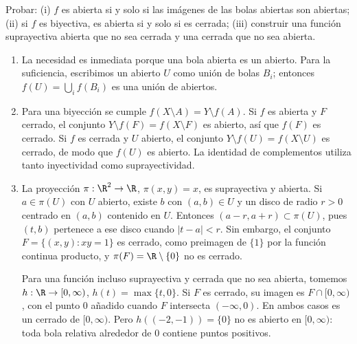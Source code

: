 \begin{ejercicio}\label{ej:lectura-5-7}
Probar: (i) $f$ es abierta si y solo si las imágenes de las bolas abiertas son abiertas; (ii) si $f$ es biyectiva, es abierta si y solo si es cerrada; (iii) construir una función suprayectiva abierta que no sea cerrada y una cerrada que no sea abierta.
\end{ejercicio}
\begin{solucion}
\begin{enumerate}[label=(\roman*)]
\item La necesidad es inmediata porque una bola abierta es un abierto. Para la suficiencia, escribimos un abierto $U$ como unión de bolas $B_i$; entonces $f(U)=\bigcup_if(B_i)$ es una unión de abiertos.
\item Para una biyección se cumple $f(X\setminus A)=Y\setminus f(A)$. Si $f$ es abierta y $F$ cerrado, el conjunto $Y\setminus f(F)=f(X\setminus F)$ es abierto, así que $f(F)$ es cerrado. Si $f$ es cerrada y $U$ abierto, el conjunto $Y\setminus f(U)=f(X\setminus U)$ es cerrado, de modo que $f(U)$ es abierto. La identidad de complementos utiliza tanto inyectividad como suprayectividad.
\item La proyección $\pi:\R^2\to\R$, $\pi(x,y)=x$, es suprayectiva y abierta. Si $a\in\pi(U)$ con $U$ abierto, existe $b$ con $(a,b)\in U$ y un disco de radio $r>0$ centrado en $(a,b)$ contenido en $U$. Entonces $(a-r,a+r)\subset\pi(U)$, pues $(t,b)$ pertenece a ese disco cuando $|t-a|<r$. Sin embargo, el conjunto $F=\{(x,y):xy=1\}$ es cerrado, como preimagen de $\{1\}$ por la función continua producto, y $\pi(F)=\R\setminus\{0\}$ no es cerrado.

Para una función incluso suprayectiva y cerrada que no sea abierta, tomemos $h:\R\to[0,\infty)$, $h(t)=\max\{t,0\}$. Si $F$ es cerrado, su imagen es $F\cap[0,\infty)$, con el punto $0$ añadido cuando $F$ intersecta $(-\infty,0)$. En ambos casos es un cerrado de $[0,\infty)$. Pero $h((-2,-1))=\{0\}$ no es abierto en $[0,\infty)$: toda bola relativa alrededor de $0$ contiene puntos positivos.
\end{enumerate}
\end{solucion}

